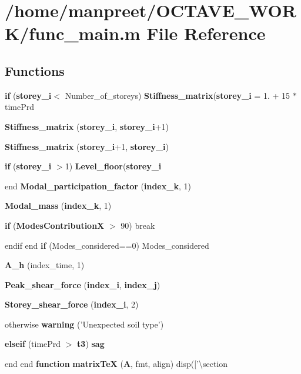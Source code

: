 \section{/home/manpreet/\-O\-C\-T\-A\-V\-E\-\_\-\-W\-O\-R\-K/func\-\_\-main.m File Reference}
\label{func__main_8m}
\subsection*{Functions}
\begin{DoxyCompactItemize}
\item 
{\bf if} ({\bf storey\-\_\-i}$<$ Number\-\_\-of\-\_\-storeys) {\bf Stiffness\-\_\-matrix}({\bf storey\-\_\-i} = 1. + 15 $\ast$ time\-Prd
\item 
{\bf Stiffness\-\_\-matrix} ({\bf storey\-\_\-i}, {\bf storey\-\_\-i}+1)
\item 
{\bf Stiffness\-\_\-matrix} ({\bf storey\-\_\-i}+1, {\bf storey\-\_\-i})
\item 
{\bf if} ({\bf storey\-\_\-i} $>$1) {\bf Level\-\_\-floor}({\bf storey\-\_\-i}
\item 
end {\bf Modal\-\_\-participation\-\_\-factor} ({\bf index\-\_\-k}, 1)
\item 
{\bf Modal\-\_\-mass} ({\bf index\-\_\-k}, 1)
\item 
{\bf if} ({\bf Modes\-Contribution\-X} $>$ 90) break
\item 
endif end {\bf if} (Modes\-\_\-considered==0) Modes\-\_\-considered
\item 
{\bf A\-\_\-h} (index\-\_\-time, 1)
\item 
{\bf Peak\-\_\-shear\-\_\-force} ({\bf index\-\_\-i}, {\bf index\-\_\-j})
\item 
{\bf Storey\-\_\-shear\-\_\-force} ({\bf index\-\_\-i}, 2)
\item 
otherwise {\bf warning} ('Unexpected soil type')
\item 
{\bf elseif} (time\-Prd $>$ {\bf t3}) {\bf sag}
\item 
end end {\bf function} {\bf matrix\-Te\-X} ({\bf A}, fmt, align) disp(['\textbackslash{}section
\end{DoxyCompactItemize}
